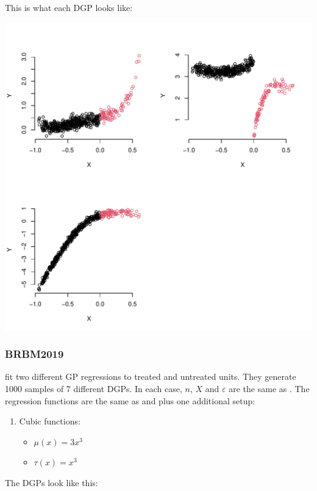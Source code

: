 \documentclass[11pt]{article}
\begin{document}
This is what each DGP looks like:

\begin{center}
\includegraphics[width=.9\linewidth]{CCT2014.pdf}
\end{center}

\subsubsection{BRBM2019}
\label{sec:orgce3953f}
\cite{branson2019nonparametric} fit two different GP
regressions to treated and untreated units. They generate
1000 samples of 7 different DGPs. In each case, \(n\), \(X\) and
\(\varepsilon\) are the same as \cite{imbens2012optimal}. The
regression functions are the same as \cite{imbens2012optimal}
and \cite{calonico2014robust} plus one additional setup:

\begin{enumerate}
\item Cubic functions:
\begin{itemize}
\item \(\mu(x) = 3 x^3\)
\item \(\tau(x) = x^3\)
\end{itemize}
\end{enumerate}

The DGPs look like this:
\end{document}
